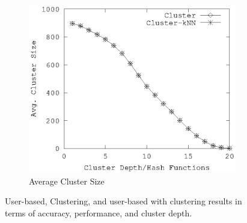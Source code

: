 \documentclass[conference]{IEEEtran}
\begin{document}
\begin{figure}[!h]
\begin{subfigure}[b]{0.225\textwidth}
        \end{subfigure} 
        \\
         \begin{subfigure}[b]{0.225\textwidth}
                \includegraphics[width=\textwidth]{charts/cl-size.eps}
                \caption{Average Cluster Size}
                \label{fig:cl-size}
        \end{subfigure} 
        \caption{User-based, Clustering, and user-based with clustering results in terms of accuracy, performance, and cluster depth.}
        \label{fig:custering}
\end{figure}
\end{document}
